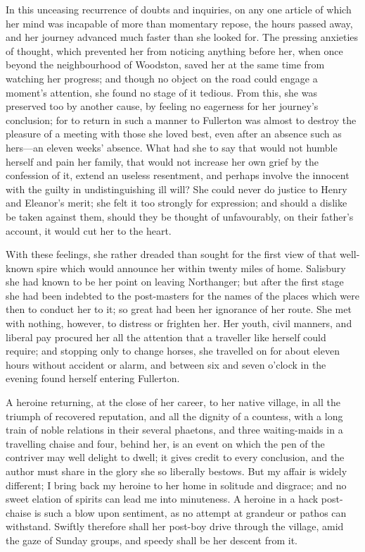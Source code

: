 In this unceasing recurrence of doubts and inquiries, on any one article of which her mind was incapable of more than momentary repose, the hours passed away, and her journey advanced much faster than she looked for. The pressing anxieties of thought, which prevented her from noticing anything before her, when once beyond the neighbourhood of Woodston, saved her at the same time from watching her progress; and though no object on the road could engage a moment's attention, she found no stage of it tedious. From this, she was preserved too by another cause, by feeling no eagerness for her journey's conclusion; for to return in such a manner to Fullerton was almost to destroy the pleasure of a meeting with those she loved best, even after an absence such as hers---an eleven weeks' absence. What had she to say that would not humble herself and pain her family, that would not increase her own grief by the confession of it, extend an useless resentment, and perhaps involve the innocent with the guilty in undistinguishing ill will? She could never do justice to Henry and Eleanor's merit; she felt it too strongly for expression; and should a dislike be taken against them, should they be thought of unfavourably, on their father's account, it would cut her to the heart.

With these feelings, she rather dreaded than sought for the first view of that well-known spire which would announce her within twenty miles of home. Salisbury she had known to be her point on leaving Northanger; but after the first stage she had been indebted to the post-masters for the names of the places which were then to conduct her to it; so great had been her ignorance of her route. She met with nothing, however, to distress or frighten her. Her youth, civil manners, and liberal pay procured her all the attention that a traveller like herself could require; and stopping only to change horses, she travelled on for about eleven hours without accident or alarm, and between six and seven o'clock in the evening found herself entering Fullerton.

A heroine returning, at the close of her career, to her native village, in all the triumph of recovered reputation, and all the dignity of a countess, with a long train of noble relations in their several phaetons, and three waiting-maids in a travelling chaise and four, behind her, is an event on which the pen of the contriver may well delight to dwell; it gives credit to every conclusion, and the author must share in the glory she so liberally bestows. But my affair is widely different; I bring back my heroine to her home in solitude and disgrace; and no sweet elation of spirits can lead me into minuteness. A heroine in a hack post-chaise is such a blow upon sentiment, as no attempt at grandeur or pathos can withstand. Swiftly therefore shall her post-boy drive through the village, amid the gaze of Sunday groups, and speedy shall be her descent from it.

